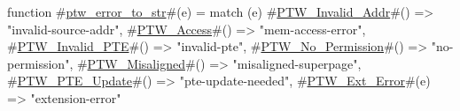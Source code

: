 function #\hyperref[sailRISCVzptwzyerrorzytozystr]{ptw\_error\_to\_str}#(e) =
  match (e) {
    #\hyperref[sailRISCVzPTWzyInvalidzyAddr]{PTW\_Invalid\_Addr}#()   => "invalid-source-addr",
    #\hyperref[sailRISCVzPTWzyAccess]{PTW\_Access}#()         => "mem-access-error",
    #\hyperref[sailRISCVzPTWzyInvalidzyPTE]{PTW\_Invalid\_PTE}#()    => "invalid-pte",
    #\hyperref[sailRISCVzPTWzyNozyPermission]{PTW\_No\_Permission}#()  => "no-permission",
    #\hyperref[sailRISCVzPTWzyMisaligned]{PTW\_Misaligned}#()     => "misaligned-superpage",
    #\hyperref[sailRISCVzPTWzyPTEzyUpdate]{PTW\_PTE\_Update}#()     => "pte-update-needed",
    #\hyperref[sailRISCVzPTWzyExtzyError]{PTW\_Ext\_Error}#(e)     => "extension-error"
  }
